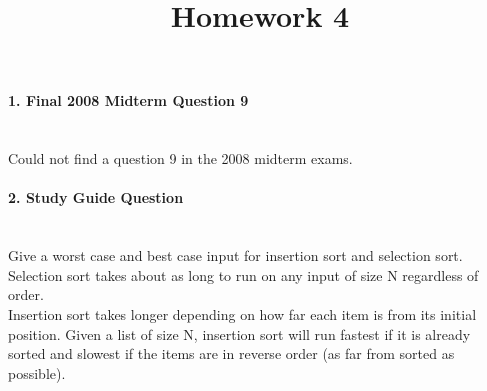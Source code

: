 \documentclass{article}
\begin{document}
\title{Homework 4}
\date{}
\maketitle

\paragraph{\Large 1. Final 2008 Midterm Question 9}\mbox{}\\
Could not find a question 9 in the 2008 midterm exams.

\paragraph{\Large 2. Study Guide Question}\mbox{}\\
Give a worst case and best case input for insertion sort and selection sort.\\

Selection sort takes about as long to run on any input of size N regardless of order.\\
Insertion sort takes longer depending on how far each item is from its initial position. Given a list of size N, insertion sort will run fastest if it is already sorted and slowest if the items are in reverse order (as far from sorted as possible).
\end{document}
